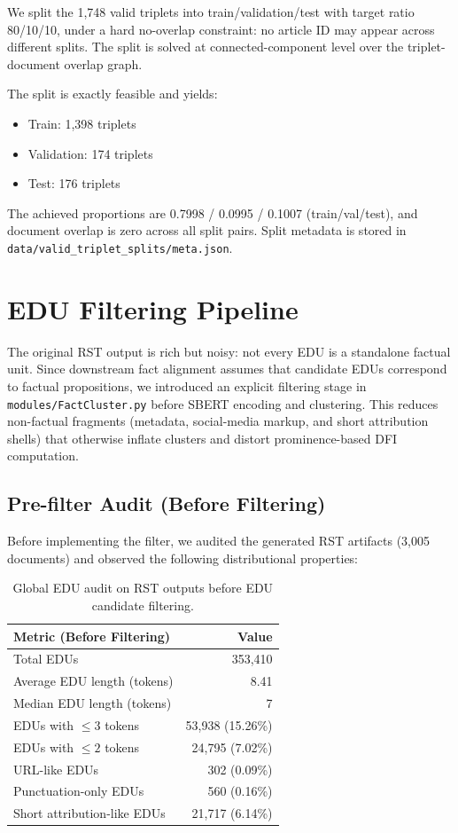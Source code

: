 \documentclass[12pt,a4paper]{article}
\begin{document}
We split the 1,748 valid triplets into train/validation/test with target ratio 80/10/10,
under a hard no-overlap constraint: no article ID may appear across different splits.
The split is solved at connected-component level over the triplet-document overlap graph.

The split is exactly feasible and yields:
\begin{itemize}
\item Train: 1,398 triplets
\item Validation: 174 triplets
\item Test: 176 triplets
\end{itemize}

The achieved proportions are 0.7998 / 0.0995 / 0.1007 (train/val/test),
and document overlap is zero across all split pairs.
Split metadata is stored in \texttt{data/valid\_triplet\_splits/meta.json}.

\section{EDU Filtering Pipeline}

The original RST output is rich but noisy: not every EDU is a standalone factual unit.
Since downstream fact alignment assumes that candidate EDUs correspond to factual propositions,
we introduced an explicit filtering stage in \texttt{modules/FactCluster.py} before SBERT encoding and clustering.
This reduces non-factual fragments (metadata, social-media markup, and short attribution shells)
that otherwise inflate clusters and distort prominence-based DFI computation.

\subsection{Pre-filter Audit (Before Filtering)}

Before implementing the filter, we audited the generated RST artifacts (3,005 documents)
and observed the following distributional properties:

\begin{table}[h]
\centering
\begin{tabular}{lr}
\hline
\textbf{Metric (Before Filtering)} & \textbf{Value} \\
\hline
Total EDUs & 353,410 \\
Average EDU length (tokens) & 8.41 \\
Median EDU length (tokens) & 7 \\
EDUs with $\leq 3$ tokens & 53,938 (15.26\%) \\
EDUs with $\leq 2$ tokens & 24,795 (7.02\%) \\
URL-like EDUs & 302 (0.09\%) \\
Punctuation-only EDUs & 560 (0.16\%) \\
Short attribution-like EDUs & 21,717 (6.14\%) \\
\hline
\end{tabular}
\caption{Global EDU audit on RST outputs before EDU candidate filtering.}
\label{tab:edu_prefilter_audit}
\end{table}
\end{document}
